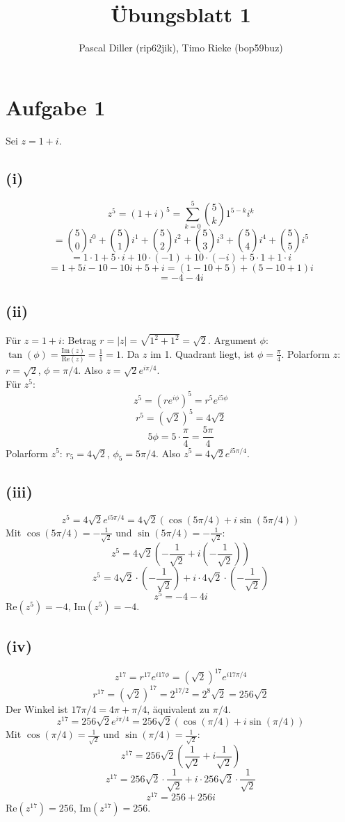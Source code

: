 \documentclass{article}
\title{Übungsblatt 1}
\author{Pascal Diller (rip62jik), Timo Rieke (bop59buz)}
\begin{document}
\maketitle

\section*{Aufgabe 1}
Sei $z=1+i$.

\subsection*{(i)}
\[ z^5 = (1+i)^5 = \sum_{k=0}^{5} \binom{5}{k} 1^{5-k} i^k \]
\[ = \binom{5}{0}i^0 + \binom{5}{1}i^1 + \binom{5}{2}i^2 + \binom{5}{3}i^3 + \binom{5}{4}i^4 + \binom{5}{5}i^5 \]
\[ = 1 \cdot 1 + 5 \cdot i + 10 \cdot (-1) + 10 \cdot (-i) + 5 \cdot 1 + 1 \cdot i \]
\[ = 1 + 5i - 10 - 10i + 5 + i = (1-10+5) + (5-10+1)i \]
\[ = -4 - 4i \]

\subsection*{(ii)}
Für $z = 1+i$: Betrag $r = |z| = \sqrt{1^2+1^2} = \sqrt{2}$.
Argument $\phi$: $\tan(\phi) = \frac{\text{Im}(z)}{\text{Re}(z)} = \frac{1}{1} = 1$. Da $z$ im 1. Quadrant liegt, ist $\phi = \frac{\pi}{4}$.
Polarform $z$: $r=\sqrt{2}$, $\phi=\pi/4$. Also $z = \sqrt{2}e^{i\pi/4}$. \\ \newline  
Für $z^5$:
\[ z^5 = (re^{i\phi})^5 = r^5 e^{i5\phi} \]
\[ r^5 = (\sqrt{2})^5 = 4\sqrt{2} \]
\[ 5\phi = 5 \cdot \frac{\pi}{4} = \frac{5\pi}{4} \]
Polarform $z^5$: $r_5=4\sqrt{2}$, $\phi_5=5\pi/4$. Also $z^5 = 4\sqrt{2}e^{i5\pi/4}$.

\subsection*{(iii)}
\[ z^5 = 4\sqrt{2} e^{i5\pi/4} = 4\sqrt{2} (\cos(5\pi/4) + i\sin(5\pi/4)) \]
Mit $\cos(5\pi/4) = -\frac{1}{\sqrt{2}}$ und $\sin(5\pi/4) = -\frac{1}{\sqrt{2}}$:
\[ z^5 = 4\sqrt{2} (-\frac{1}{\sqrt{2}} + i(-\frac{1}{\sqrt{2}})) \]
\[ z^5 = 4\sqrt{2} \cdot (-\frac{1}{\sqrt{2}}) + i \cdot 4\sqrt{2} \cdot (-\frac{1}{\sqrt{2}}) \]
\[ z^5 = -4 - 4i \]
$\text{Re}(z^5) = -4$, $\text{Im}(z^5) = -4$.

\subsection*{(iv)}
\[ z^{17} = r^{17} e^{i17\phi} = (\sqrt{2})^{17} e^{i17\pi/4} \]
\[ r^{17} = (\sqrt{2})^{17} = 2^{17/2} = 2^8 \sqrt{2} = 256\sqrt{2} \]
Der Winkel ist $17\pi/4 = 4\pi + \pi/4$, äquivalent zu $\pi/4$.
\[ z^{17} = 256\sqrt{2} e^{i\pi/4} = 256\sqrt{2} (\cos(\pi/4) + i\sin(\pi/4)) \]
Mit $\cos(\pi/4) = \frac{1}{\sqrt{2}}$ und $\sin(\pi/4) = \frac{1}{\sqrt{2}}$:
\[ z^{17} = 256\sqrt{2} (\frac{1}{\sqrt{2}} + i\frac{1}{\sqrt{2}}) \]
\[ z^{17} = 256\sqrt{2} \cdot \frac{1}{\sqrt{2}} + i \cdot 256\sqrt{2} \cdot \frac{1}{\sqrt{2}} \]
\[ z^{17} = 256 + 256i \]
$\text{Re}(z^{17}) = 256$, $\text{Im}(z^{17}) = 256$.
\end{document}
